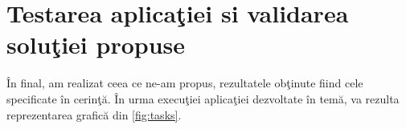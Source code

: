 \documentclass[a4paper, 11pt]{article}
\begin{document}
\section{Testarea aplica\c{t}iei si validarea solu\c{t}iei propuse}

\^{I}n final, am realizat ceea ce ne-am propus, rezultatele ob\c{t}inute fiind cele specificate \^{i}n cerin\c{t}\u{a}. \^{I}n urma execu\c{t}iei aplica\c{t}iei dezvoltate \^{i}n tem\u{a}, va rezulta reprezentarea grafic\u{a} din \autoref{fig:tasks}. 
\end{document}
